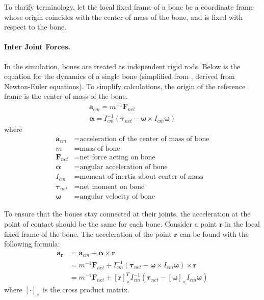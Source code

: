 \documentclass[10pt,twocolumn,letterpaper]{article}
\begin{document}
To clarify terminology, let the local fixed frame of a bone be a coordinate frame whose origin coincides with the center of mass of the bone, and is fixed with respect to the bone. 

\paragraph{Inter Joint Forces.} In the simulation, bones are treated as independent rigid rods. Below is the equation for the dynamics of a single bone (simplified from \cite{Pi}, derived from Newton-Euler equations). To simplify calculations, the origin of the reference frame is the center of mass of the bone.
\begin{equation}
    \begin{gathered} 
        \bm{a}_{cm} = m^{-1} \bm{F}_{net} \\
        \bm{\alpha} = I_{cm}^{-1} (\bm{\tau}_{net} - \bm{\omega} \times I_{cm} \bm{\omega}) 
    \end{gathered} 
\end{equation}
where
\begin{align*}
    \bm{a}_{cm} &= \text{acceleration of the center of mass of bone} \\
    m &= \text{mass of bone} \\
    \bm{F}_{net} &= \text{net force acting on bone} \\
    \bm{\alpha} &= \text{angular acceleration of bone} \\
    I_{cm} &= \text{moment of inertia about center of mass} \\
    \bm{\tau}_{net} &= \text{net moment on bone} \\
    \bm{\omega} &= \text{angular velocity of bone}
\end{align*}

To ensure that the bones stay connected at their joints, the acceleration at the point of contact should be the same for each bone. Consider a point $\bm{r}$ in the local fixed frame of the bone. The acceleration of the point $\bm{r}$ can be found with the following formula:
\begin{equation}
    \begin{aligned}
        \bm{a_r} &= \bm{a}_{cm} + \bm{\alpha} \times \bm{r} \\
        &= m^{-1}\bm{F}_{net} + I_{cm}^{-1} (\bm{\tau}_{net} - \bm{\omega} \times I_{cm} \bm{\omega}) \times \bm{r} \\
        &= m^{-1}\bm{F}_{net} + [\bm{r}]_\times^T I_{cm}^{-1} (\bm{\tau}_{net} - [\bm{\omega}]_\times I_{cm} \bm{\omega})
    \end{aligned}
\end{equation}
where $[\cdot]_\times$ is the cross product matrix. 
\end{document}

